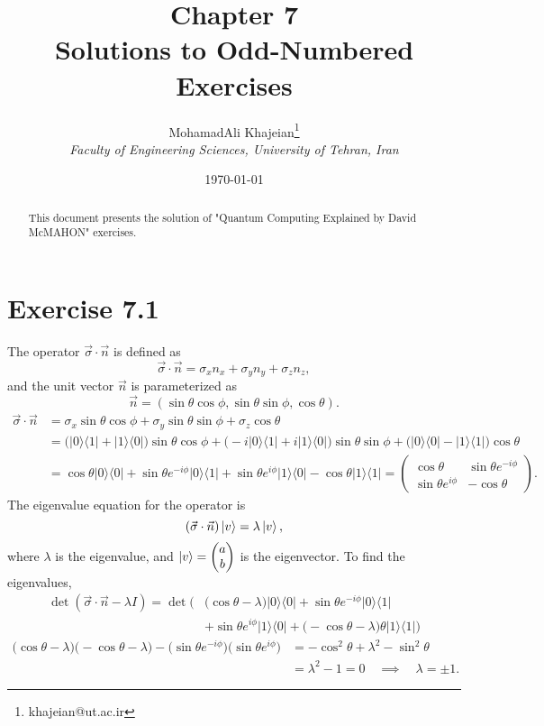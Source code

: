 \documentclass{article}
\title{\textbf{Chapter 7} \\ \small Solutions to Odd-Numbered Exercises}
\author{
    MohamadAli Khajeian\footnote{khajeian@ut.ac.ir} \\ 
    \small \textit{Faculty of Engineering Sciences, University of Tehran, Iran} \\ 
}
\date{\today}
\newcommand{\op}[2]{|#1\rangle \langle#2|}
\begin{document}
\maketitle

\begin{abstract}
    This document presents the solution of "Quantum Computing Explained by David McMAHON" exercises.
\end{abstract}

\section*{Exercise 7.1}

The operator \(\vec{\sigma} \cdot \vec{n}\) is defined as
\[
\vec{\sigma} \cdot \vec{n} = \sigma_x n_x + \sigma_y n_y + \sigma_z n_z,
\]
and the unit vector \(\vec{n}\) is parameterized as
\[
\vec{n} = (\sin\theta\cos\phi, \sin\theta\sin\phi, \cos\theta).
\]
\begin{align*}
\vec{\sigma} \cdot \vec{n} &= \sigma_x\sin\theta\cos\phi + \sigma_y\sin\theta\sin\phi + \sigma_z\cos\theta \\
&= \big(\op{0}{1}+\op{1}{0}\big)\sin\theta\cos\phi + \big(-i\op{0}{1}+i\op{1}{0}\big)\sin\theta\sin\phi +\big(\op{0}{0}-\op{1}{1}\big)\cos\theta \\
&= \cos\theta\op{0}{0} + \sin\theta e^{-i\phi}\op{0}{1} + \sin\theta e^{i\phi}\op{1}{0} -\cos\theta \op{1}{1} = \begin{pmatrix} \cos\theta & \sin\theta e^{-i\phi} \\ \sin\theta e^{i\phi} & -\cos\theta \end{pmatrix}.
\end{align*}
The eigenvalue equation for the operator is
\[
(\vec{\sigma} \cdot \vec{n}) \ket{v} = \lambda \ket{v},
\]
where \(\lambda\) is the eigenvalue, and \(\ket{v} = \begin{pmatrix} a \\ b \end{pmatrix}\) is the eigenvector. To find the eigenvalues,
\begin{align*}
\det(\vec{\sigma} \cdot \vec{n} - \lambda I) = \det\bigg(&\big(\cos\theta-\lambda\big)\op{0}{0} + \sin\theta e^{-i\phi}\op{0}{1} \\&+ \sin\theta e^{i\phi}\op{1}{0} +  \big(-\cos\theta-\lambda\big)\theta \op{1}{1}\bigg)
\end{align*}
\begin{align*}
    \big(\cos\theta-\lambda\big)\big(-\cos\theta-\lambda\big) - \big(\sin\theta e^{-i\phi}\big)\big(\sin\theta e^{i\phi}\big)
    &= - \cos^2\theta + \lambda^2 - \sin^2\theta \\
    &= \lambda^2 - 1 = 0 \quad \implies \quad \lambda = \pm 1.
\end{align*}
\end{document}
